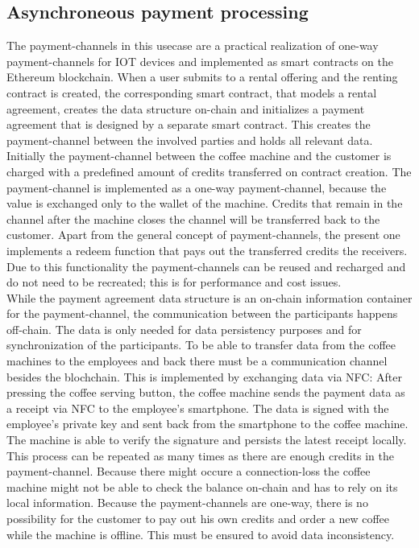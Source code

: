 \documentclass[conference]{IEEEtran}
\begin{document}
\subsection{Asynchroneous payment processing}
The payment-channels in this usecase are a practical realization of one-way payment-channels for IOT devices and implemented as smart contracts on the Ethereum blockchain. When a user submits to a rental offering and the renting contract is created, the corresponding smart contract, that models a rental agreement, creates the data structure on-chain and initializes a payment agreement that is designed by a separate smart contract. This creates the payment-channel between the involved parties and holds all relevant data.\\
Initially the payment-channel between the coffee machine and the customer is charged with a predefined amount of credits transferred on contract creation. The payment-channel is implemented as a one-way payment-channel, because the value is exchanged only to the wallet of the machine. Credits that remain in the channel after the machine closes the channel will be transferred back to the customer. Apart from the general concept of payment-channels, the present one implements a redeem function that pays out the transferred credits the receivers. Due to this functionality the payment-channels can be reused and recharged and do not need to be recreated; this is for performance and cost issues.\\
While the payment agreement data structure is an on-chain information container for the payment-channel, the communication between the participants happens off-chain. The data is only needed for data persistency purposes and for synchronization of the participants. To be able to transfer data from the coffee machines to the employees and back there must be a communication channel besides the blochchain. This is implemented by exchanging data via NFC: After pressing the coffee serving button, the coffee machine sends the payment data as a receipt via NFC to the employee's smartphone. The data is signed with the employee's private key and sent back from the smartphone to the coffee machine. The machine is able to verify the signature and persists the latest receipt locally. This process can be repeated as many times as there are enough credits in the payment-channel. Because there might occure a connection-loss the coffee machine might not be able to check the balance on-chain and has to rely on its local information. Because the payment-channels are one-way, there is no possibility for the customer to pay out his own credits and order a new coffee while the machine is offline. This must be ensured to avoid data inconsistency.\\
\end{document}
